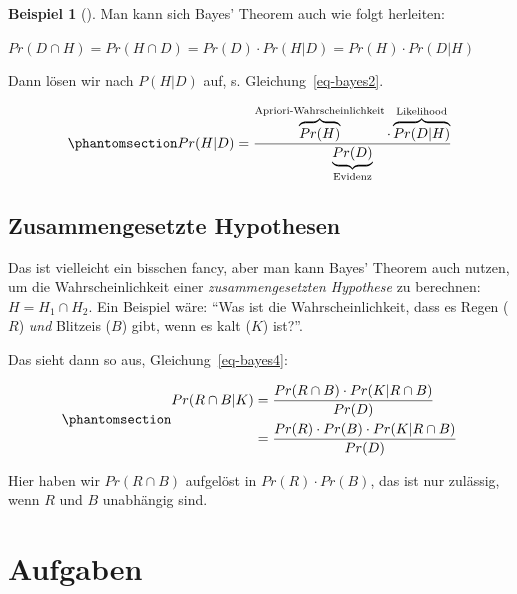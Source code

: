 \documentclass[
  ngerman,
  letterpaper,
  twoside,
  open=any]{scrbook}
\theoremstyle{definition}
\newtheorem{example}{Beispiel}[chapter]
\theoremstyle{plain}
\theoremstyle{definition}
\theoremstyle{definition}
\theoremstyle{remark}
\begin{document}
\begin{example}[]
Man kann sich Bayes' Theorem auch wie folgt herleiten:

\(Pr(D\cap H) = Pr(H \cap D) = Pr(D) \cdot Pr(H|D) = Pr(H) \cdot Pr(D|H)\)

Dann lösen wir nach \(P(H|D)\) auf, s. Gleichung~\ref{eq-bayes2}.

\begin{equation}\protect\phantomsection\label{eq-bayes2}{Pr(H|D) = \frac{\overbrace{Pr(H)}^\text{Apriori-Wahrscheinlichkeit} \cdot \overbrace{Pr(D|H)}^\text{Likelihood}}{\underbrace{Pr(D)}_\text{Evidenz}}}\end{equation}

\subsection{Zusammengesetzte
Hypothesen}\label{zusammengesetzte-hypothesen}

Das ist vielleicht ein bisschen fancy, aber man kann Bayes' Theorem auch
nutzen, um die Wahrscheinlichkeit einer \emph{zusammengesetzten
Hypothese} zu berechnen: \(H = H_1 \cap H_2\). Ein Beispiel wäre:
\enquote{Was ist die Wahrscheinlichkeit, dass es Regen (\(R\))
\emph{und} Blitzeis (\(B\)) gibt, wenn es kalt (\(K\)) ist?}.

Das sieht dann so aus, Gleichung~\ref{eq-bayes4}:

\begin{equation}\protect\phantomsection\label{eq-bayes4}{
\begin{aligned}
Pr(R \cap B |K) &= \frac{ Pr(R \cap B) \cdot Pr(K|R \cap B) }{Pr(D)} \\
&= \frac{ Pr(R ) \cdot Pr(B) \cdot Pr(K|R \cap B) }{Pr(D)}
\end{aligned}
}\end{equation}

Hier haben wir \(Pr(R \cap B)\) aufgelöst in \(Pr(R) \cdot Pr(B)\), das
ist nur zulässig, wenn \(R\) und \(B\) unabhängig sind.

\section{Aufgaben}\label{aufgaben-5}

\begin{tcolorbox}[enhanced jigsaw, arc=.35mm, bottomrule=.15mm, bottomtitle=1mm, breakable, colback=white, colbacktitle=quarto-callout-tip-color!10!white, colframe=quarto-callout-tip-color-frame, coltitle=black, left=2mm, leftrule=.75mm, opacityback=0, opacitybacktitle=0.6, rightrule=.15mm, title=\textcolor{quarto-callout-tip-color}{\faLightbulb}\hspace{0.5em}{Tipp}, titlerule=0mm, toprule=.15mm, toptitle=1mm]


\end{tcolorbox}
\end{example}
\end{document}
